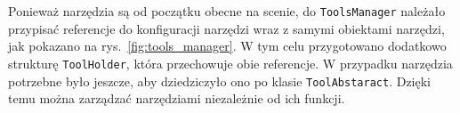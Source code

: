 

Ponieważ narzędzia są od początku obecne na scenie, 
do \texttt{ToolsManager} należało przypisać referencje do konfiguracji narzędzi wraz z samymi obiektami narzędzi,
jak pokazano na rys.~\ref{fig:tools_manager}.
W tym celu przygotowano dodatkowo strukturę \texttt{ToolHolder},
która przechowuje obie referencje.
W przypadku narzędzia potrzebne było jeszcze,
aby dziedziczyło ono po klasie \texttt{ToolAbstaract}.
Dzięki temu można zarządzać narzędziami niezależnie od ich funkcji.

